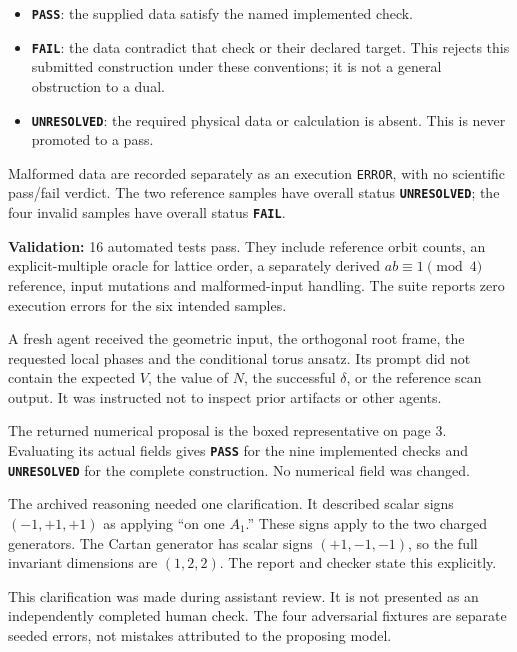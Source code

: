 \documentclass[10pt,a4paper]{article}
\newcommand{\sect}[1]{\vspace{7pt}{\fontsize{15}{18}\selectfont #1}\par\vspace{-4pt}{\color{bodyink}\rule{\linewidth}{0.35pt}}\par\vspace{-3pt}}
\newcommand{\note}[1]{\par\vspace{4pt}\noindent\colorbox{pale}{\parbox{\dimexpr\linewidth-2\fboxsep\relax}{\small #1}}\par\vspace{4pt}}
\newcommand{\status}[1]{\texttt{\bfseries #1}}
\newcommand{\pagekey}{01}
\newcommand{\pagelabel}{The example}
\newcommand{\pagesummary}{One geometric target.\par One proposed representative.\par Exact, bounded checks.}
\begin{document}
\sect{What the statuses mean}
\begin{itemize}
\item \status{PASS}: the supplied data satisfy the named implemented check.
\item \status{FAIL}: the data contradict that check or their declared target. This rejects this submitted construction under these conventions; it is not a general obstruction to a dual.
\item \status{UNRESOLVED}: the required physical data or calculation is absent. This is never promoted to a pass.
\end{itemize}
Malformed data are recorded separately as an execution \texttt{ERROR}, with no scientific pass/fail verdict. The two reference samples have overall status \status{UNRESOLVED}; the four invalid samples have overall status \status{FAIL}.

\note{\textbf{Validation:} 16 automated tests pass. They include reference orbit counts, an explicit-multiple oracle for lattice order, a separately derived \(ab\equiv1\pmod4\) reference, input mutations and malformed-input handling. The suite reports zero execution errors for the six intended samples.}

\newpage
\renewcommand{\pagekey}{05}\renewcommand{\pagelabel}{Model review}
\renewcommand{\pagesummary}{Save the proposal.\par Check each value.\par Log the review.}
\sect{An actual model proposal}
A fresh agent received the geometric input, the orthogonal root frame, the requested local phases and the conditional torus ansatz. Its prompt did not contain the expected \(V\), the value of \(N\), the successful \(\delta\), or the reference scan output. It was instructed not to inspect prior artifacts or other agents.

The returned numerical proposal is the boxed representative on page 3. Evaluating its actual fields gives \status{PASS} for the nine implemented checks and \status{UNRESOLVED} for the complete construction. No numerical field was changed.

The archived reasoning needed one clarification. It described scalar signs \((-1,+1,+1)\) as applying ``on one \(A_1\).'' These signs apply to the two charged generators. The Cartan generator has scalar signs \((+1,-1,-1)\), so the full invariant dimensions are \((1,2,2)\). The report and checker state this explicitly.

\note{This clarification was made during assistant review. It is not presented as an independently completed human check. The four adversarial fixtures are separate seeded errors, not mistakes attributed to the proposing model.}
\end{document}
